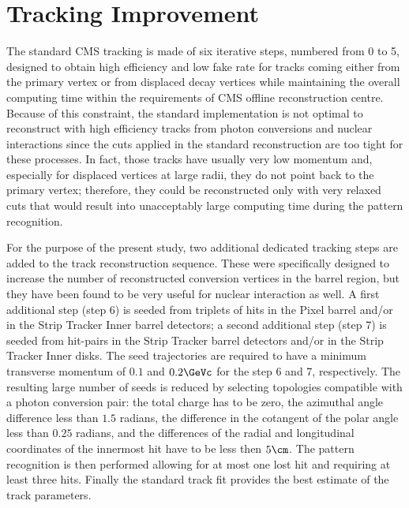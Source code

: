 \section{Tracking Improvement}
\label{singleleg}


The standard CMS tracking is made of six iterative steps, numbered
from 0 to 5, designed to obtain high efficiency and low fake rate for
tracks coming either from the primary vertex or from displaced decay
vertices while maintaining the overall computing time within the
requirements of CMS offline reconstruction centre.
Because of this constraint, the standard implementation is not optimal
to reconstruct with high efficiency tracks from photon conversions and
nuclear interactions since the cuts applied in the standard
reconstruction are too tight for these processes. In fact, those
tracks have usually very low momentum and, especially for displaced
vertices at large radii, they do not point  back to the primary
vertex; therefore, they could be reconstructed only with very relaxed
cuts that would result into unacceptably large computing time during
the pattern recognition.

For the purpose of the present study, two additional dedicated
tracking steps are added to the track reconstruction sequence.
These were specifically designed to increase the number of
reconstructed conversion vertices in the barrel region,
but they have been found to be very useful for nuclear interaction as
well. A first additional step (step 6) is seeded from triplets of hits
in the Pixel barrel and/or in the Strip Tracker Inner barrel
detectors; a second additional step (step 7) is seeded from hit-pairs
in the Strip Tracker barrel detectors and/or in the Strip Tracker Inner disks.
The seed trajectories are required
to have a minimum transverse momentum of $0.1$ and $0.2\GeVc$ for the
step 6 and 7, respectively. The resulting large number of seeds is
reduced by selecting topologies compatible with a photon conversion
pair: the total charge has to be zero,
the azimuthal angle difference less than $1.5$ radians, the difference
in the cotangent of the polar angle less than $0.25$ radians, and the
differences of the radial and longitudinal coordinates of the
innermost hit have to be less then $5\cm$.
The pattern recognition is then performed allowing for at most one
lost hit and requiring at least three hits. Finally the standard track
fit provides the best estimate of the track parameters.

